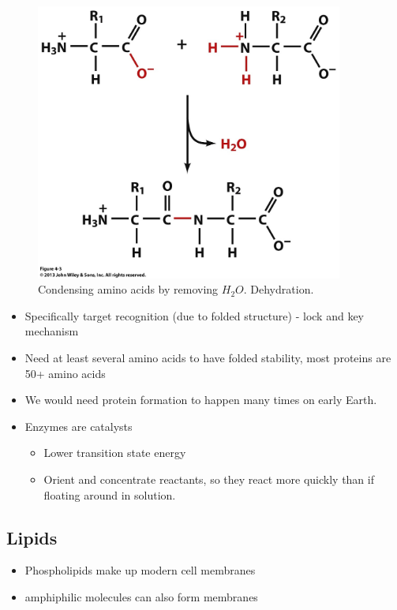 \documentclass[]{article}
\begin{document}
\begin{figure}[H]
	\caption{Condensing amino acids by removing $H_2O$. Dehydration.}\label{fig:AminoAcidsCondensed} 
	\includegraphics[width=0.9\textwidth]{AminoAcidsCondensed}
\end{figure}

\begin{itemize}
	\item  Specifically target recognition (due to folded
	structure) - lock and key mechanism
	\item  Need at least several amino acids to have
	folded stability, most proteins are 50+ amino
	acids
	\item We would need protein formation to happen many times on early Earth.
	\item Enzymes are catalysts
	\begin{itemize}
		\item Lower transition state energy
		\item Orient and concentrate reactants, so they react more quickly than if floating around in solution.
	\end{itemize}
\end{itemize}



\subsection{Lipids}
\cite[14.2 Lipids \& Triglycerides]{brown2009chemistry}

\begin{itemize}
	\item Phospholipids make up modern cell
	membranes
	\item amphiphilic molecules can also form
	membranes
\end{itemize}
\end{document}
